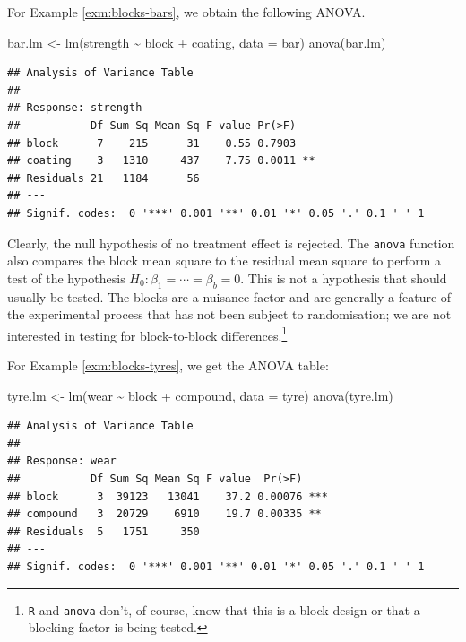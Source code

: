 \documentclass[
]{book}
\newenvironment{Shaded}{\begin{snugshade}}{\end{snugshade}}
\newcommand{\AttributeTok}[1]{\textcolor[rgb]{0.77,0.63,0.00}{#1}}
\newcommand{\FunctionTok}[1]{\textcolor[rgb]{0.00,0.00,0.00}{#1}}
\newcommand{\NormalTok}[1]{#1}
\newcommand{\OtherTok}[1]{\textcolor[rgb]{0.56,0.35,0.01}{#1}}
\newcommand{\SpecialCharTok}[1]{\textcolor[rgb]{0.00,0.00,0.00}{#1}}
\theoremstyle{definition}
\theoremstyle{definition}
\theoremstyle{definition}
\theoremstyle{definition}
\theoremstyle{remark}
\begin{document}
For Example \ref{exm:blocks-bars}, we obtain the following ANOVA.

\begin{Shaded}
\begin{Highlighting}[]
\NormalTok{bar.lm }\OtherTok{\textless{}{-}} \FunctionTok{lm}\NormalTok{(strength }\SpecialCharTok{\textasciitilde{}}\NormalTok{ block }\SpecialCharTok{+}\NormalTok{ coating, }\AttributeTok{data =}\NormalTok{ bar)}
\FunctionTok{anova}\NormalTok{(bar.lm)}
\end{Highlighting}
\end{Shaded}

\begin{verbatim}
## Analysis of Variance Table
## 
## Response: strength
##           Df Sum Sq Mean Sq F value Pr(>F)   
## block      7    215      31    0.55 0.7903   
## coating    3   1310     437    7.75 0.0011 **
## Residuals 21   1184      56                  
## ---
## Signif. codes:  0 '***' 0.001 '**' 0.01 '*' 0.05 '.' 0.1 ' ' 1
\end{verbatim}

Clearly, the null hypothesis of no treatment effect is rejected. The \texttt{anova} function also compares the block mean square to the residual mean square to perform a test of the hypothesis \(H_0: \beta_1 = \cdots = \beta_b = 0\). This is not a hypothesis that should usually be tested. The blocks are a nuisance factor and are generally a feature of the experimental process that has not been subject to randomisation; we are not interested in testing for block-to-block differences.\footnote{\texttt{R} and \texttt{anova} don't, of course, know that this is a block design or that a blocking factor is being tested.}

For Example \ref{exm:blocks-tyres}, we get the ANOVA table:

\begin{Shaded}
\begin{Highlighting}[]
\NormalTok{tyre.lm }\OtherTok{\textless{}{-}} \FunctionTok{lm}\NormalTok{(wear }\SpecialCharTok{\textasciitilde{}}\NormalTok{ block }\SpecialCharTok{+}\NormalTok{ compound, }\AttributeTok{data =}\NormalTok{ tyre)}
\FunctionTok{anova}\NormalTok{(tyre.lm)}
\end{Highlighting}
\end{Shaded}

\begin{verbatim}
## Analysis of Variance Table
## 
## Response: wear
##           Df Sum Sq Mean Sq F value  Pr(>F)    
## block      3  39123   13041    37.2 0.00076 ***
## compound   3  20729    6910    19.7 0.00335 ** 
## Residuals  5   1751     350                    
## ---
## Signif. codes:  0 '***' 0.001 '**' 0.01 '*' 0.05 '.' 0.1 ' ' 1
\end{verbatim}
\end{document}
